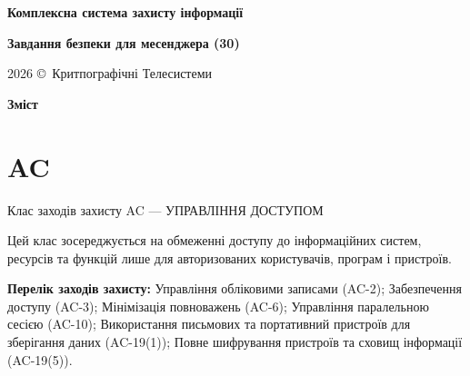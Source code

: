 \documentclass{article}
\newcommand\HUGE[1]{\fontsize{40}{40}\selectfont #1}
\begin{document}
\pagestyle{fancy}

\begin{titlepage}
  \AddToShipoutPictureBG*{\AtPageLowerLeft{\color{nato}\rule{\paperwidth}{\paperheight}}}
  \color{white}\thispagestyle{empty}\vspace*{2cm}\centering
  {\Huge  \textbf{Комплексна система захисту інформації} \par} \vspace{1cm}
  {\HUGE  \textbf{Завдання безпеки для месенджера (30)} \par} \vspace{1cm}
  \vfill
  {\large 2026 \copyright\ Критпографічні Телесистеми \par}
\end{titlepage}

\newpage

\begin{center}
  {\Huge\color{nato}\bfseries Зміст\par}
\end{center}
\vspace{40pt}
\tableofcontents

\begin{abstract}
Завдання з безпеки для забезпечення конфіденційності, цілісності повідомлень та управління сесіями в месенджері.
\end{abstract}

\section{AC}
Клас заходів захисту AC --- УПРАВЛІННЯ ДОСТУПОМ

Цей клас зосереджується на обмеженні доступу до інформаційних систем, ресурсів та функцій лише для авторизованих користувачів, програм і пристроїв.

\textbf{Перелік заходів захисту:} Управління обліковими записами (AC-2); Забезпечення доступу (AC-3); Мінімізація повноважень (AC-6); Управління паралельною сесією (AC-10); Використання письмових та портативний пристроїв для зберігання даних (AC-19(1)); Повне шифрування пристроїв та сховищ інформації (AC-19(5)).
\end{document}
